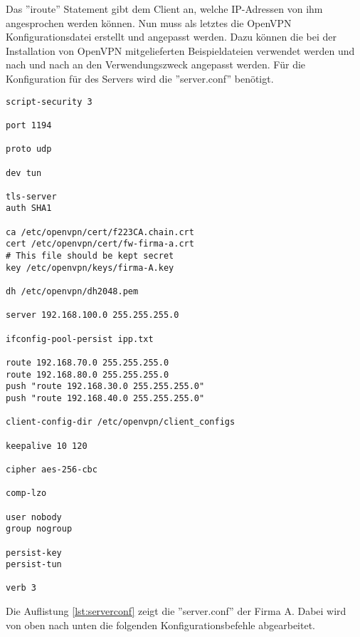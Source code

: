 Das ''iroute'' Statement gibt dem Client an, welche IP-Adressen von ihm angesprochen werden können. \newline Nun muss als letztes die OpenVPN Konfigurationsdatei erstellt und angepasst werden. Dazu können die bei der Installation von OpenVPN mitgelieferten Beispieldateien verwendet werden und nach und nach an den Verwendungszweck angepasst werden. Für die Konfiguration für des Servers wird die ''server.conf'' benötigt.\newline
\lstset{
	basicstyle=\footnotesize, frame=tb,
	xleftmargin=.2\textwidth, xrightmargin=.2\textwidth
}
\begin{lstlisting}[caption={server.conf Datei der Firma A},label=lst:serverconf]
script-security 3

port 1194

proto udp

dev tun

tls-server
auth SHA1

ca /etc/openvpn/cert/f223CA.chain.crt
cert /etc/openvpn/cert/fw-firma-a.crt
# This file should be kept secret
key /etc/openvpn/keys/firma-A.key  

dh /etc/openvpn/dh2048.pem

server 192.168.100.0 255.255.255.0

ifconfig-pool-persist ipp.txt

route 192.168.70.0 255.255.255.0
route 192.168.80.0 255.255.255.0
push "route 192.168.30.0 255.255.255.0"
push "route 192.168.40.0 255.255.255.0"

client-config-dir /etc/openvpn/client_configs

keepalive 10 120

cipher aes-256-cbc

comp-lzo

user nobody	
group nogroup

persist-key
persist-tun

verb 3

\end{lstlisting}
\vspace{\baselineskip}
Die Auflistung \ref{lst:serverconf} zeigt die ''server.conf'' der Firma A. Dabei wird von oben nach unten die folgenden Konfigurationsbefehle abgearbeitet.
